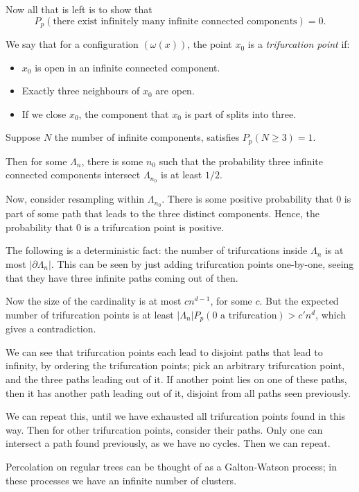 \documentclass[12pt]{article}
\begin{document}
Now all that is left is to show that
\[
	P_p(\text{there exist infinitely many infinite connected components}) = 0.
\]
\begin{proofbox}
	We say that for a configuration $(\omega(x))$, the point $x_0$ is a \emph{trifurcation point} if:
	\begin{itemize}
		\item $x_0$ is open in an infinite connected component.
		\item Exactly three neighbours of $x_0$ are open.
		\item If we close $x_0$, the component that $x_0$ is part of splits into three.
	\end{itemize}
	Suppose $N$ the number of infinite components, satisfies $P_p(N \geq 3) = 1$.

	Then for some $\Lambda_n$, there is some $n_0$ such that the probability three infinite connected components intersect $\Lambda_{n_0}$ is at least $1/2$.

	Now, consider resampling within $\Lambda_{n_0}$. There is some positive probability that $0$ is part of some path that leads to the three distinct components. Hence, the probability that $0$ is a trifurcation point is positive.

	The following is a deterministic fact: the number of trifurcations inside $\Lambda_n$ is at most $|\partial \Lambda_n|$. This can be seen by just adding trifurcation points one-by-one, seeing that they have three infinite paths coming out of then.

	Now the size of the cardinality is at most $c n^{d-1}$, for some $c$. But the expected number of trifurcation points is at least $|\Lambda_n| P_p(0 \text{ a trifurcation}) > c' n^{d}$, which gives a contradiction.

	We can see that trifurcation points each lead to disjoint paths that lead to infinity, by ordering the trifurcation points; pick an arbitrary trifurcation point, and the three paths leading out of it. If another point lies on one of these paths, then it has another path leading out of it, disjoint from all paths seen previously.

	We can repeat this, until we have exhausted all trifurcation points found in this way. Then for other trifurcation points, consider their paths. Only one can intersect a path found previously, as we have no cycles. Then we can repeat.
\end{proofbox}

Percolation on regular trees can be thought of as a Galton-Watson process; in these processes we have an infinite number of clusters.
\end{document}
